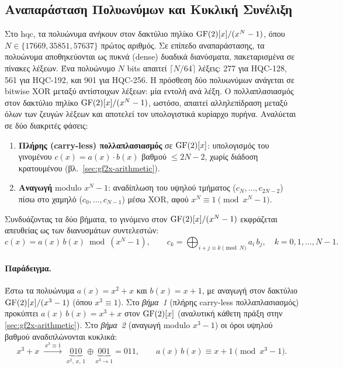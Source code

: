 \subsection{Αναπαράσταση Πολυωνύμων και Κυκλική Συνέλιξη}
\label{sec:hqc-poly-representation}

Στο \gls{hqc}, τα πολυώνυμα ανήκουν στον δακτύλιο πηλίκο $\mathrm{GF}(2)[x]/(x^{N}-1)$, όπου
$N \in \{17669, 35851, 57637\}$ πρώτος αριθμός. Σε επίπεδο αναπαράστασης, τα
πολυώνυμα αποθηκεύονται ως πυκνά (dense) δυαδικά διανύσματα, πακεταρισμένα σε
πίνακες  λέξεων. Ένα πολυώνυμο $N$ bits απαιτεί
$\lceil N/64 \rceil$ λέξεις: \num{277} για HQC-128, \num{561} για HQC-192, και
\num{901} για HQC-256.
Η πρόσθεση δύο πολυωνύμων ανάγεται σε bitwise XOR μεταξύ αντίστοιχων λέξεων:
μία εντολή ανά λέξη.
Ο πολλαπλασιασμός στον δακτύλιο πηλίκο $\mathrm{GF}(2)[x]/(x^{N}-1)$, ωστόσο, απαιτεί αλληλεπίδραση
μεταξύ όλων των ζευγών λέξεων και αποτελεί τον υπολογιστικά κυρίαρχο πυρήνα.
Αναλύεται σε δύο διακριτές φάσεις:
\begin{enumerate}
  \item \textbf{Πλήρης (carry-less) πολλαπλασιασμός} σε $\mathrm{GF}(2)[x]$: υπολογισμός
    του γινομένου $c(x) = a(x) \cdot b(x)$ βαθμού $\leq 2N - 2$, χωρίς διάδοση
    κρατουμένου (βλ.~\cref{sec:gf2x-arithmetic}).
  \item \textbf{Αναγωγή} modulo $x^N - 1$: αναδίπλωση του υψηλού τμήματος
    ($c_{N}, \ldots, c_{2N-2}$) πίσω στο χαμηλό ($c_0, \ldots, c_{N-1}$) μέσω
    XOR, αφού $x^N \equiv 1 \pmod{x^N - 1}$.
\end{enumerate}
Συνδυάζοντας τα δύο βήματα, το γινόμενο στον
$\mathrm{GF}(2)[x]/(x^{N}-1)$ εκφράζεται απευθείας ως  των διανυσμάτων
συντελεστών:
\begin{equation}
  c(x) = a(x)\,b(x) \bmod (x^N-1), \qquad
  c_k = \bigoplus_{i+j \equiv k \!\!\pmod{N}} a_i\, b_j,
  \quad k = 0, 1, \dots, N-1.
  \label{eq:cyclic-convolution}
\end{equation}
\paragraph{Παράδειγμα.}
Έστω τα πολυώνυμα $a(x)=x^2+x$ και $b(x)=x+1$, με αναγωγή στον δακτύλιο $\mathrm{GF}(2)[x]/(x^{3}-1)$ (όπου $x^3 \equiv 1$). Στο \emph{βήμα~1} (πλήρης carry-less
πολλαπλασιασμός) προκύπτει $a(x)\,b(x)=x^3+x$ στον $\mathrm{GF}(2)[x]$ (αναλυτική κάθετη
πράξη στην \cref{sec:gf2x-arithmetic}). Στο \emph{βήμα~2} (αναγωγή modulo $x^3-1$) οι
όροι υψηλού βαθμού αναδιπλώνονται κυκλικά:
\begin{equation}
  x^3 + x \;\xrightarrow{\,x^3 \equiv 1\,}\;
  \underbrace{010}_{x^2,\,x,\,1} \mathbin{\oplus} \underbrace{001}_{x^3 \to 1} = 011,
  \qquad a(x)\,b(x) \equiv x + 1 \pmod{x^3 - 1}.
  \label{eq:quotient-example}
\end{equation}

